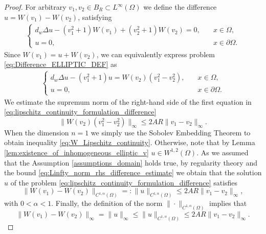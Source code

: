 \documentclass[preprint,12pt]{elsarticle}
\theoremstyle{plain}
\theoremstyle{definition}
\theoremstyle{remark}
\begin{document}
\begin{proof}
    For arbitrary $v_1, v_2 \in B_R \subset L^\infty(\Omega)$ we define the difference $u = W(v_1) - W(v_2)$, satisfying 
    \begin{align}
        \label{eq:Difference_ELLIPTIC_DEF}
        \begin{cases}
            d_w\Delta u - (v_1^2 + 1) W(v_1) + (v_2^2 + 1) W(v_2) = 0, &\quad x \in \Omega, \\
            u = 0, &\quad x \in \partial\Omega.
        \end{cases}
    \end{align}
    Since $W(v_1) = u + W(v_2)$, we can equivalently express problem \eqref{eq:Difference_ELLIPTIC_DEF} as
    \begin{align}
        \label{eq:lipschitz_continuity_formulation_difference}
        \begin{cases}
            d_w\Delta u - (v_1^2 + 1) u  = W(v_2) (v_1^2 - v_2^2), &\quad x \in \Omega, \\
            u = 0, &\quad x \in \partial\Omega.
        \end{cases}
    \end{align}
    We estimate the supremum norm of the right-hand side of the first equation in \eqref{eq:lipschitz_continuity_formulation_difference}
    \begin{equation}
        \label{eq:Linfty_norm_rhs_difference_estimate}
        \|W(v_2) (v_1^2-v_2^2)\|_\infty \leq 2AR\|v_1-v_2\|_\infty.
    \end{equation}
    When the dimension $n=1$ we simply use the Sobolev Embedding Theorem \cite[Theorem 8.8]{brezis2010functional} to obtain inequality \eqref{eq:W_Lipschitz_continuity}. Otherwise, note that by Lemma \ref{lem:existence_of_inhomogeneous_elliptic_v} $u \in W^{1,2}(\Omega)$. As we assumed that the Assumption \ref{assumptions_domain} holds true, by regularity theory \cite[Theorems 8.33 and 8.34]{gilbarg2001elliptic} and the bound \eqref{eq:Linfty_norm_rhs_difference_estimate} we obtain that the solution $u$ of the problem \eqref{eq:lipschitz_continuity_formulation_difference} satisfies
    \begin{equation}
        \|W(v_1) - W(v_2)\|_{C^{1, \alpha}(\Omega)} =: \|u\|_{C^{1, \alpha}(\Omega)}  \leq 2AR\|v_1-v_2\|_\infty,
    \end{equation}
    with $0 < \alpha < 1$. Finally, the definition of the norm $\|\cdot\|_{C^{1,\alpha}(\Omega)}$ implies that 
    \begin{equation}
        \|W(v_1) - W(v_2)\|_\infty = \|u\|_\infty \leq \|u\|_{C^{1, \alpha}(\Omega)}  \leq 2AR\|v_1-v_2\|_\infty.
    \end{equation}
\end{proof}
\end{document}
